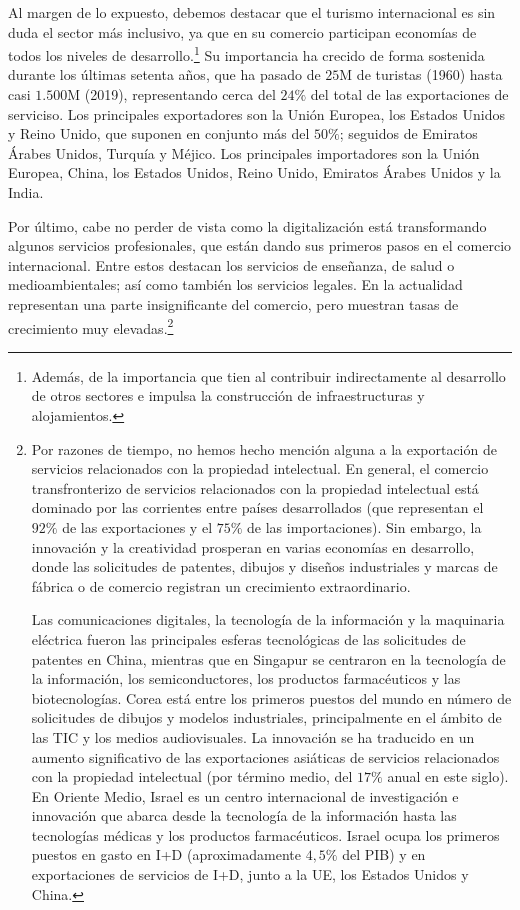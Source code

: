 \documentclass[10pt,a4paper]{article}
\begin{document}
Al margen de lo expuesto, debemos destacar que el turismo internacional es sin duda el sector más inclusivo, ya que en su comercio participan economías de todos los niveles de desarrollo.\footnote{%
    Además, de la importancia que tien al contribuir indirectamente al desarrollo de otros sectores e impulsa la construcción de infraestructuras y alojamientos.
} Su importancia ha crecido de forma sostenida durante los últimas setenta años, que ha pasado de $25\text{M}$ de turistas (1960) hasta casi $1.500\text{M}$ (2019), representando cerca del $24\%$ del total de las exportaciones de serviciso. Los principales exportadores son la Unión Europea, los Estados Unidos y Reino Unido, que suponen en conjunto más del $50\%$; seguidos de Emiratos Árabes Unidos, Turquía y Méjico. Los principales importadores son la Unión Europea, China, los Estados Unidos, Reino Unido, Emiratos Árabes Unidos y la India. 

Por último, cabe no perder de vista como la digitalización está transformando algunos servicios profesionales, que están dando sus primeros pasos en el comercio internacional. Entre estos destacan los servicios de enseñanza, de salud o medioambientales; así como también los servicios legales. En la actualidad representan una parte insignificante del comercio, pero muestran tasas de crecimiento muy elevadas.\footnote{%
    Por razones de tiempo, no hemos hecho mención alguna a la exportación de servicios relacionados con la propiedad intelectual. En general, el comercio transfronterizo de servicios relacionados con la propiedad intelectual está dominado por las corrientes entre países desarrollados (que representan el $92\%$ de las exportaciones y el $75\%$ de las importaciones). Sin embargo, la innovación y la creatividad prosperan en varias economías en desarrollo, donde las solicitudes de patentes, dibujos y diseños industriales y marcas de fábrica o de comercio registran un crecimiento extraordinario. 

Las comunicaciones digitales, la tecnología de la información y la maquinaria eléctrica fueron las principales esferas tecnológicas de las solicitudes de patentes en China, mientras que en Singapur se centraron en la tecnología de la información, los semiconductores, los productos farmacéuticos y las biotecnologías. Corea está entre los primeros puestos del mundo en número de solicitudes de dibujos y modelos industriales, principalmente en el ámbito de las TIC y los medios audiovisuales. La innovación se ha traducido en un aumento significativo de las exportaciones asiáticas de servicios relacionados con la propiedad intelectual (por término medio, del $17\%$ anual en este siglo). En Oriente Medio, Israel es un centro internacional de investigación e innovación que abarca desde la tecnología de la información hasta las tecnologías médicas y los productos farmacéuticos. Israel ocupa los primeros puestos en gasto en I+D (aproximadamente $4,5\%$ del PIB) y en exportaciones de servicios de I+D, junto a la UE, los Estados Unidos y China.
}
\end{document}
